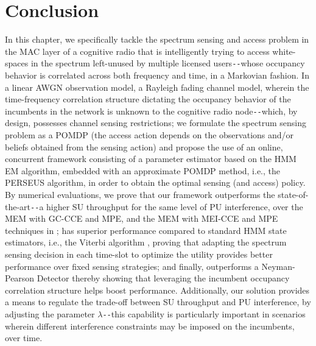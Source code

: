 \section{Conclusion}\label{IV}
In this chapter, we specifically tackle the spectrum sensing and access problem in the MAC layer of a cognitive radio that is intelligently trying to access white-spaces in the spectrum left-unused by multiple licensed users\texttt{-{}-}whose occupancy behavior is correlated across both frequency and time, in a Markovian fashion. In a linear AWGN observation model, a Rayleigh fading channel model, wherein the time-frequency correlation structure dictating the occupancy behavior of the incumbents in the network is unknown to the cognitive radio node\texttt{-{}-}which, by design, possesses channel sensing restrictions; we formulate the spectrum sensing problem as a POMDP (the access action depends on the observations and/or beliefs obtained from the sensing action) and propose the use of an online, concurrent framework consisting of a parameter estimator based on the HMM EM algorithm, embedded with an approximate POMDP method, i.e., the PERSEUS algorithm, in order to obtain the optimal sensing (and access) policy. By numerical evaluations, we prove that our framework outperforms the state-of-the-art\texttt{-{}-}a higher SU throughput for the same level of PU interference, over the MEM with GC-CCE and MPE, and the MEM with MEI-CCE and MPE techniques in \cite{WCL:7}; has superior performance compared to standard HMM state estimators, i.e., the Viterbi algorithm \cite{WCL:6}, proving that adapting the spectrum sensing decision in each time-slot to optimize the utility provides better performance over fixed sensing strategies; and finally, outperforms a Neyman-Pearson Detector \cite{WCL:11} thereby showing that leveraging the incumbent occupancy correlation structure helps boost performance. Additionally, our solution provides a means to regulate the trade-off between SU throughput and PU interference, by adjusting the parameter $\lambda$\texttt{-{}-}this capability is particularly important in scenarios wherein different interference constraints may be imposed on the incumbents, over time.